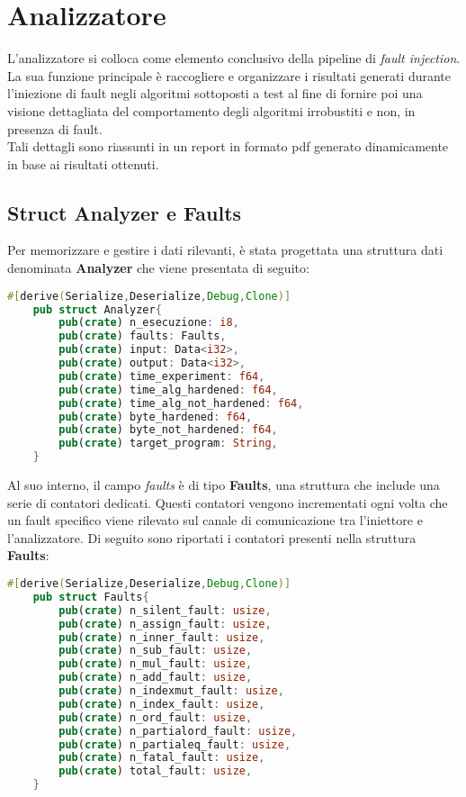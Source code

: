 \section{Analizzatore}\label{sec:analizer}
L'analizzatore si colloca come elemento conclusivo della pipeline di \textit{fault injection}. La sua funzione principale è raccogliere e organizzare i risultati generati durante l'iniezione di fault negli algoritmi sottoposti a test al fine di fornire poi una visione dettagliata del comportamento degli algoritmi irrobustiti e non, in presenza di fault.\\
Tali dettagli sono riassunti in un report in formato pdf generato dinamicamente in base ai risultati ottenuti. 

\subsection{Struct Analyzer e Faults}
Per memorizzare e gestire i dati rilevanti, è stata progettata una struttura dati denominata \textbf{Analyzer} che viene presentata di seguito:
\begin{lstlisting}[language=rust, style=boxed]
    #[derive(Serialize,Deserialize,Debug,Clone)]
    pub struct Analyzer{
        pub(crate) n_esecuzione: i8,
        pub(crate) faults: Faults,
        pub(crate) input: Data<i32>,
        pub(crate) output: Data<i32>,
        pub(crate) time_experiment: f64,
        pub(crate) time_alg_hardened: f64,
        pub(crate) time_alg_not_hardened: f64,
        pub(crate) byte_hardened: f64,
        pub(crate) byte_not_hardened: f64,
        pub(crate) target_program: String,
    }
\end{lstlisting}

Al suo interno, il campo \textit{faults} è di tipo \textbf{Faults}, una struttura che include una serie di contatori dedicati. Questi contatori vengono incrementati ogni volta che un fault specifico viene rilevato sul canale di comunicazione tra l'iniettore e l'analizzatore. Di seguito sono riportati i contatori presenti nella struttura \textbf{Faults}:
\begin{lstlisting}[language=rust, style=boxed]
    #[derive(Serialize,Deserialize,Debug,Clone)]
    pub struct Faults{
        pub(crate) n_silent_fault: usize,
        pub(crate) n_assign_fault: usize,
        pub(crate) n_inner_fault: usize,
        pub(crate) n_sub_fault: usize,
        pub(crate) n_mul_fault: usize,
        pub(crate) n_add_fault: usize,
        pub(crate) n_indexmut_fault: usize,
        pub(crate) n_index_fault: usize,
        pub(crate) n_ord_fault: usize,
        pub(crate) n_partialord_fault: usize,
        pub(crate) n_partialeq_fault: usize,
        pub(crate) n_fatal_fault: usize,
        pub(crate) total_fault: usize,
    }
\end{lstlisting}

